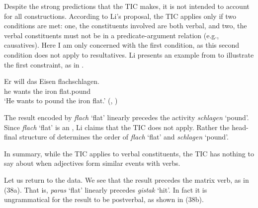 \documentclass[output=paper]{LSP/langsci}
\begin{document}
Despite the strong predictions that the TIC makes, it is not intended to account for all  constructions. According to Li's proposal, the TIC applies only if two conditions are met: one, the constituents involved are both verbal, and two, the verbal constituents must not be in a predicate-argument relation (e.g., causatives). Here I am only concerned with the first condition, as this second condition does not apply to  resultatives. Li presents an example from  to illustrate the first constraint, as in .

\begin{exe}
\ex\label{ex:rosen:37}
 \gll Er will das Eisen flachschlagen.\\
he wants the iron flat.pound\\
\glt `He wants to pound the iron flat.' (\citealt[501]{Li1993}, )

\end{exe}

The result encoded by \textit{flach} `flat' linearly precedes the activity \textit{schlagen} `pound'. Since \textit{flach} `flat' is an , Li claims that the TIC does not apply. Rather the head-final structure of  determines the order of \textit{flach} `flat' and \textit{schlagen} `pound'. 

In summary, while the TIC applies to verbal constituents, the TIC has nothing to say about when adjectives form similar events with verbs.

Let us return to the  data. We see that the result precedes the matrix verb, as in (38a). That is, \textit{paras} `flat' linearly precedes \textit{gistak} `hit'. In fact it is ungrammatical for the result to be postverbal, as shown in (38b).

\begin{exe}
\ex\label{ex:rosen:38}
\begin{xlist}



\end{xlist}
\end{exe}
\end{document}
